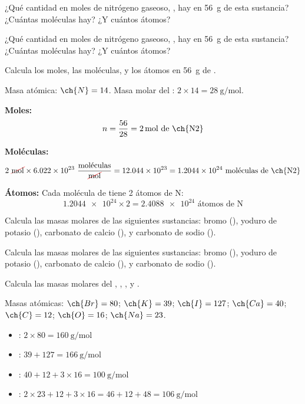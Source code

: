 \begin{exercise}
    ¿Qué cantidad en moles de nitrógeno gaseoso, , hay en \qty{56}{\g} de esta sustancia? ¿Cuántas moléculas hay? ¿Y cuántos átomos?
    \begin{solu}
        ¿Qué cantidad en moles de nitrógeno gaseoso, , hay en \qty{56}{\g} de esta sustancia? ¿Cuántas moléculas hay? ¿Y cuántos átomos?

        Calcula los moles, las moléculas, y los átomos en \qty{56}{\g} de .

        Masa atómica: \( \ch{N} = 14 \). Masa molar del : \( 2 \times 14 = \qty{28}{\g\per\mole} \).

        \textbf{Moles:}
        \begin{equation*}
            n = \dfrac{56}{28} = \qty{2}{\mole} \text{ de \ch{N2}}
        \end{equation*}

        \textbf{Moléculas:}
        \begin{equation*}
            2\ \cancelred{\unit{\mole}} \times \num{6.022e23}\ \dfrac{\text{moléculas}}{\cancelred{\unit{\mole}}} = \num{12.044e23} = \num{1.2044e24} \text{ moléculas de \ch{N2}}
        \end{equation*}

        \textbf{Átomos:} Cada molécula de  tiene 2 átomos de N:
        \begin{equation*}
            \num{1.2044e24} \times 2 = \num{2.4088e24} \text{ átomos de N}
        \end{equation*}
    \end{solu}
\end{exercise}

\begin{exercise}
    Calcula las masas molares de las siguientes sustancias: bromo (), yoduro de potasio (), carbonato de calcio (), y carbonato de sodio ().
    \begin{solu}
        Calcula las masas molares de las siguientes sustancias: bromo (), yoduro de potasio (), carbonato de calcio (), y carbonato de sodio ().

        Calcula las masas molares del , , , y .

        Masas atómicas: \( \ch{Br} = 80 \); \( \ch{K} = 39 \); \( \ch{I} = 127 \); \( \ch{Ca} = 40 \); \( \ch{C} = 12 \); \( \ch{O} = 16 \); \( \ch{Na} = 23 \).
        \begin{itemize}
            \item {}: \( 2 \times 80 = \qty{160}{\g\per\mole} \)
            \item {}: \( 39 + 127 = \qty{166}{\g\per\mole} \)
            \item {}: \( 40 + 12 + 3 \times 16 = \qty{100}{\g\per\mole} \)
            \item {}: \( 2 \times 23 + 12 + 3 \times 16 = 46 + 12 + 48 = \qty{106}{\g\per\mole} \)
        \end{itemize}
    \end{solu}
\end{exercise}


